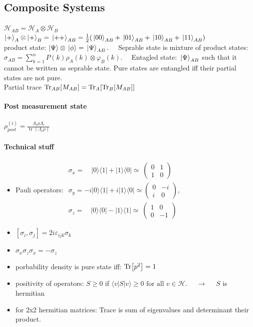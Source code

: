 \subsection{Composite Systems} 
$\mathcal{H}_{AB} = \mathcal{H}_A \otimes \mathcal{H}_B$\\
$\ket{+}_A\otimes \ket{+}_B = \ket*{++}_{AB} = \frac{1}{2} (\ket*{00}_{AB}+ \ket*{01}_{AB}+ \ket*{10}_{AB}+\ket*{11}_{AB})$\\
product state: $\ket{\Psi}\otimes \ket*{\phi} = \ket*{\Psi}_{AB}. \quad$ 
Seprable state is mixture of product states: $\sigma_{A B}=\sum_{k=1}^n P(k) \rho_A(k) \otimes \varphi_B(k). \quad$
Entagled state: $\ket*{\Psi}_{AB}$ such that it cannot be written as seprable state. Pure states are entangled iff their partial states are not pure.\\
Partial trace $\Tr_{AB}[M_{AB}] = \Tr_A[\Tr_B[M_{AB}]]$

\paragraph{Post measurement state} $\rho_{p o s t}^{(i)}=\frac{\Lambda_i \rho \Lambda_i}{\operatorname{tr}\left(\Lambda_i \rho\right)}$

\paragraph{Technical stuff}
\begin{itemize}
  \item Pauli operators: $\begin{array}{l}
    \sigma_x= \quad |0\rangle\langle 1|+| 1\rangle\langle 0| \simeq \ \left(\begin{array}{cc}
    0 & 1 \\
    1 & 0
    \end{array}\right) \\
    \sigma_y=-i|0\rangle\langle 1|+i| 1\rangle\langle 0| \simeq\left(\begin{array}{cc}
    0 & -i \\
    i & 0
    \end{array}\right), \\
    \sigma_z= \quad |0\rangle\langle 0|-| 1\rangle\langle 1| \simeq \ \left(\begin{array}{cc}
    1 & 0 \\
    0 & -1
    \end{array}\right)
    \end{array}$
  \item $\left[\sigma_i, \sigma_j\right]=2 i \varepsilon_{i j k} \sigma_k$
  \item $\sigma_x \sigma_z \sigma_x=-\sigma_z$
  \item porbability density is pure state iff: $\Tr[p^2]=1$
  \item positivity of operators: $S \geq 0$ if $\langle v|S| v\rangle \geq 0 \text { for all } v \in \mathcal{H}. \quad $ $\longrightarrow \quad$ $S$ is hermitian\\
  \item for 2x2 hermitian matrices: Trace is sum of eigenvalues and determinant their product.
\end{itemize}

